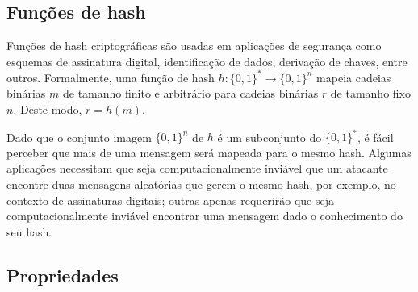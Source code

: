 \documentclass{SBCbookchapter}
\begin{document}
\begin{otherlanguage}{brazilian}

\subsection{Funções de hash}\label{functionHash}

Funções de hash criptográficas são usadas em aplicações de segurança como esquemas de assinatura digital, identificação de dados, derivação de chaves, entre outros. Formalmente, uma função de hash $h: \{0,1\}^{*} \longrightarrow \{0,1\}^{n}$ mapeia cadeias binárias $m$ de tamanho finito e arbitrário para cadeias binárias $r$ de tamanho fixo $n$. Deste modo, $r = h(m)$.

Dado que o conjunto imagem  $\{0,1\}^{n}$ de $h$ é um subconjunto do  $\{0,1\}^{*}$, é fácil perceber que mais de uma mensagem será mapeada para o mesmo hash. Algumas aplicações necessitam que seja computacionalmente inviável que um atacante encontre duas mensagens aleatórias que gerem o mesmo hash, por exemplo, no contexto de assinaturas digitais; outras apenas requerirão que seja computacionalmente inviável  encontrar uma mensagem dado o conhecimento do seu hash.

\subsection{Propriedades} \label{ssec:propriedades_fresumo}


\end{otherlanguage}
\end{document}
